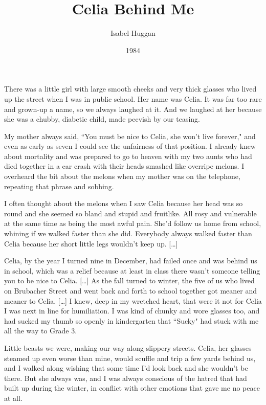 \documentclass[10pt,a4paper]{article}
\newcommand{\qm}[1]{``#1"}
\begin{document}
\title{Celia Behind Me}
\date{1984}
\author{Isabel Huggan}

\maketitle

\noindent\linenumbers There was a little girl with large smooth cheeks and very thick glasses who lived up the street when I was in public school. Her name was Celia. It was far too rare and grown-up a name, so we always laughed at it. And we laughed at her because she was a chubby, diabetic child, made peevish by our teasing.

My mother always said, \qm{You must be nice to Celia, she won't live forever,} and even as early as seven I could see the unfairness of that position. I already knew about mortality and was prepared to go to heaven with my two aunts who had died together in a car crash with their heads smashed like overripe melons. I overheard the bit about the melons when my mother was on the telephone, repeating that phrase and sobbing.

I often thought about the melons when I saw Celia because her head was so round and she seemed so bland and stupid and fruitlike. All rosy and vulnerable at the same time as being the most awful pain. She'd follow us home from school, whining if we walked faster than she did. Everybody always walked faster than Celia because her short little legs wouldn't keep up. [\ldots]

Celia, by the year I turned nine in December, had failed once and was behind us in school, which was a relief because at least in class there wasn't someone telling you to be nice to Celia. [\ldots] As the fall turned to winter, the five of us who lived on Brubacher Street and went back and forth to school together got meaner and meaner to Celia. [\ldots] I knew, deep in my wretched heart, that were it not for Celia I was next in line for humiliation. I was kind of chunky and wore glasses too, and had sucked my thumb so openly in kindergarten that \qm{Sucky} had stuck with me all the way to Grade 3.

Little beasts we were, making our way along slippery streets. Celia, her glasses steamed up even worse than mine, would scuffle and trip a few yards behind us, and I walked along wishing that some time I'd look back and she wouldn't be there. But she always was, and I was always conscious of the hatred that had built up during the winter, in conflict with other emotions that gave me no peace at all.
\end{document}
